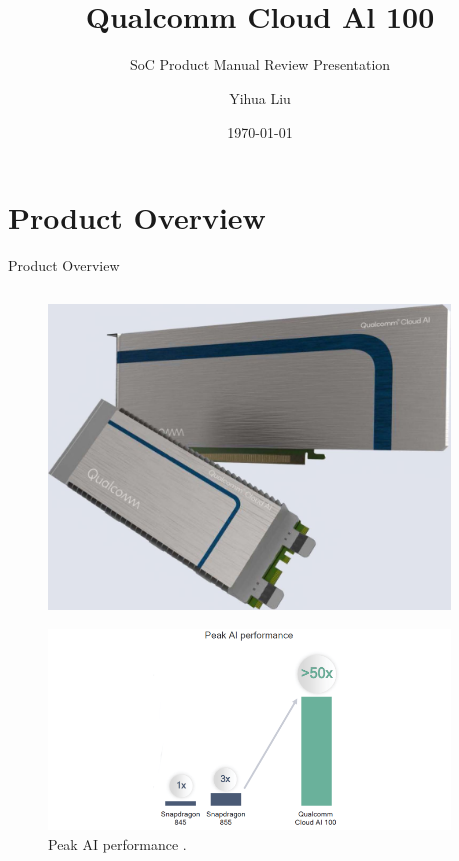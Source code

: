 \documentclass[12pt]{beamer}
\begin{document}
\title{Qualcomm\textsuperscript{\textregistered} Cloud Al 100}
\subtitle{SoC Product Manual Review Presentation}
\author{Yihua Liu}
\date{\today}
\begin{frame}
    \titlepage
\end{frame}
\section{Product Overview}
\begin{frame}{Product Overview}
    \begin{columns}
        \begin{column}{0.5\linewidth}
            \begin{figure}[H]
                \centering
                \includegraphics[width=0.8\columnwidth]{2.jpg}
            \end{figure}
            \begin{figure}[H]
                \centering
                \includegraphics[width=0.8\columnwidth]{3.png}
                \caption{\scriptsize Peak AI performance \cite{eetimes2019}.}
            \end{figure}
        \end{column}
        \begin{column}{0.5\linewidth}

\end{column}
\end{columns}
\end{frame}
\end{document}
